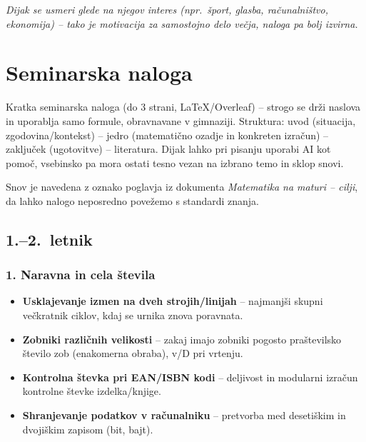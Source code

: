 \documentclass[11pt,a4paper]{article}
\begin{document}
\bigskip
\noindent\textit{Dijak se usmeri glede na njegov interes (npr.\ šport, glasba, računalništvo, ekonomija) -- tako je motivacija za samostojno delo večja, naloga pa bolj izvirna.}

\newpage
\section{Seminarska naloga}
\label{sec:seminarska}

Kratka seminarska naloga (do 3 strani, \LaTeX/Overleaf) -- strogo se drži naslova in uporablja samo formule, obravnavane v gimnaziji. Struktura: uvod (situacija, zgodovina/kontekst) -- jedro (matematično ozadje in konkreten izračun) -- zaključek (ugotovitve) -- literatura. Dijak lahko pri pisanju uporabi AI kot pomoč, vsebinsko pa mora ostati tesno vezan na izbrano temo in sklop snovi.

\medskip
\noindent Snov je navedena z oznako poglavja iz dokumenta \textit{Matematika na maturi -- cilji}, da lahko nalogo neposredno povežemo s standardi znanja.

\subsection{1.--2.\ letnik}

\subsubsection*{1. Naravna in cela števila}
\begin{itemize}
  \item \textbf{Usklajevanje izmen na dveh strojih/linijah} -- najmanjši skupni večkratnik  ciklov, kdaj se urnika znova poravnata.
  \item \textbf{Zobniki različnih velikosti} -- zakaj imajo zobniki pogosto praštevilsko število zob (enakomerna obraba), v/D pri vrtenju.
  \item \textbf{Kontrolna števka pri EAN/ISBN kodi} -- deljivost in modularni izračun kontrolne števke izdelka/knjige.
  \item \textbf{Shranjevanje podatkov v računalniku} -- pretvorba med desetiškim in dvojiškim zapisom (bit, bajt).
\end{itemize}
\end{document}
